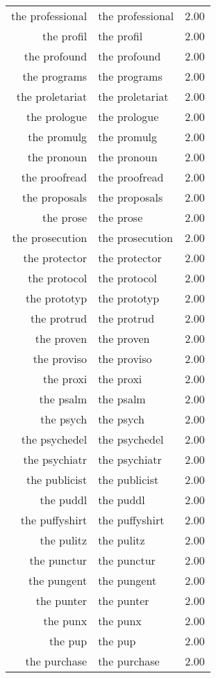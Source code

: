 \begin{table}[ht]
\begin{tabular}{rlr}
  the professional & the professional & 2.00 \\ 
  the profil & the profil & 2.00 \\ 
  the profound & the profound & 2.00 \\ 
  the programs & the programs & 2.00 \\ 
  the proletariat & the proletariat & 2.00 \\ 
  the prologue & the prologue & 2.00 \\ 
  the promulg & the promulg & 2.00 \\ 
  the pronoun & the pronoun & 2.00 \\ 
  the proofread & the proofread & 2.00 \\ 
  the proposals & the proposals & 2.00 \\ 
  the prose & the prose & 2.00 \\ 
  the prosecution & the prosecution & 2.00 \\ 
  the protector & the protector & 2.00 \\ 
  the protocol & the protocol & 2.00 \\ 
  the prototyp & the prototyp & 2.00 \\ 
  the protrud & the protrud & 2.00 \\ 
  the proven & the proven & 2.00 \\ 
  the proviso & the proviso & 2.00 \\ 
  the proxi & the proxi & 2.00 \\ 
  the psalm & the psalm & 2.00 \\ 
  the psych & the psych & 2.00 \\ 
  the psychedel & the psychedel & 2.00 \\ 
  the psychiatr & the psychiatr & 2.00 \\ 
  the publicist & the publicist & 2.00 \\ 
  the puddl & the puddl & 2.00 \\ 
  the puffyshirt & the puffyshirt & 2.00 \\ 
  the pulitz & the pulitz & 2.00 \\ 
  the punctur & the punctur & 2.00 \\ 
  the pungent & the pungent & 2.00 \\ 
  the punter & the punter & 2.00 \\ 
  the punx & the punx & 2.00 \\ 
  the pup & the pup & 2.00 \\ 
  the purchase & the purchase & 2.00 \\ 

\end{tabular}
\end{table}

